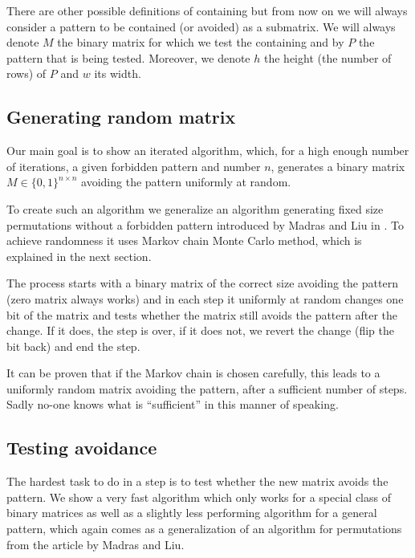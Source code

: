 There are other possible definitions of containing but from now on we will always consider a pattern to be contained (or avoided) as a submatrix. We will always denote $M$ the binary matrix for which we test the containing and by $P$ the pattern that is being tested. Moreover, we denote $h$ the height (the number of rows) of $P$ and $w$ its width.

\subsection*{Generating random matrix}
Our main goal is to show an iterated algorithm, which, for a high enough number of iterations, a given forbidden pattern and number $n$, generates a binary matrix $M\in\{0,1\}^{n\times n}$ avoiding the pattern uniformly at random.

To create such an algorithm we generalize an algorithm generating fixed size permutations without a forbidden pattern introduced by Madras and Liu in \cite{madrasliu}. To achieve randomness it uses Markov chain Monte Carlo method, which is explained in the next section.

The process starts with a binary matrix of the correct size avoiding the pattern (zero matrix always works) and in each step it uniformly at random changes one bit of the matrix and tests whether the matrix still avoids the pattern after the change. If it does, the step is over, if it does not, we revert the change (flip the bit back) and end the step.

It can be proven that if the Markov chain is chosen carefully, this leads to a uniformly random matrix avoiding the pattern, after a sufficient number of steps. Sadly no-one knows what is ``sufficient'' in this manner of speaking.

\subsection*{Testing avoidance}
The hardest task to do in a step is to test whether the new matrix avoids the pattern. We show a very fast algorithm which only works for a special class of binary matrices as well as a slightly less performing algorithm for a general pattern, which again comes as a generalization of an algorithm for permutations from the article by Madras and Liu.


